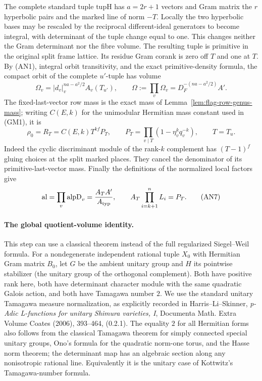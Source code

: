 The complete standard tuple \(\mathrm{tupH}\) has \(a=2r+1\)
vectors and Gram matrix the \(r\) hyperbolic pairs and the marked
line of norm \(-T\). Locally the two hyperbolic bases may be
rescaled by the reciprocal different-ideal generators to become
integral, with determinant of the tuple change equal to one.
This changes neither the Gram determinant nor the fibre volume.
The resulting tuple is primitive in the original split frame
lattice. Its residue Gram corank is zero off \(T\) and one
at \(T\). By (AN1), integral orbit transitivity, and the exact
primitive-density formula, the compact orbit of the complete
\(u'\)-tuple has volume
\[
    \Omega_v=|d_v|_v^{na-a^2/2} A_v(T_{u'}),\qquad
    \Omega:=\prod_v\Omega_v=D_F^{-(na-a^2/2)}A'.         \tag{AN5}
\]
The fixed-last-vector row mass is the exact mass of
Lemma~\ref{lem:flag-row-genus-mass}; writing \(C(E,k)\) for the
unimodular Hermitian mass constant used in (GM1), it is
\[
 \rho_0=R_T=C(E,k)T^{kf}P_T,\qquad
 P_T=\prod_{v\mid T}(1-\eta_v^kq_v^{-k}),\qquad T=T_u.    \tag{AN6}
\]
Indeed the cyclic discriminant module of the rank-\(k\) complement
has \((T-1)^f\) gluing choices at the split marked places. They
cancel the denominator of its primitive-last-vector mass. Finally
the definitions of the normalized local factors give
\[
 \mathrm{al}=\prod_v\mathrm{alpD}_v=\frac{A_T A'}{A_{\rm typ}},
 \qquad
 A_T\prod_{i=k+1}^n L_i=P_T.                            \tag{AN7}
\]

\paragraph{The global quotient-volume identity.}
This step can use a classical theorem instead of the full
regularized Siegel--Weil formula. For a nondegenerate independent
rational tuple \(X_0\) with Hermitian Gram matrix \(B_0\), let \(G\)
be the ambient unitary group and \(H\) its pointwise stabilizer
(the unitary group of the orthogonal complement). Both have
positive rank here, both have determinant character module with
the same quadratic Galois action, and both have Tamagawa number
\(2\). We use the standard unitary Tamagawa measure normalization,
as explicitly recorded in Harris--Li--Skinner,
\emph{p-Adic L-functions for unitary Shimura varieties, I},
Documenta Math. Extra Volume Coates (2006), 393--464, (0.2.1).
The equality \(2\) for all Hermitian forms also follows from the
classical Tamagawa theorem for simply connected special unitary
groups, Ono's formula for the quadratic norm-one torus, and the
Hasse norm theorem; the determinant map has an algebraic section
along any nonisotropic rational line. Equivalently it is the
unitary case of Kottwitz's Tamagawa-number formula.

